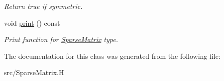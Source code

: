 \begin{DoxyCompactItemize}
\begin{DoxyCompactList}\small\item\em Return true if symmetric. \item\end{DoxyCompactList}\item 
\hypertarget{classSparseMatrix_a2ad9f6c7dc65dd71fcbb2f0461a4c5a9}{
void \hyperlink{classSparseMatrix_a2ad9f6c7dc65dd71fcbb2f0461a4c5a9}{print} () const }
\label{classSparseMatrix_a2ad9f6c7dc65dd71fcbb2f0461a4c5a9}

\begin{DoxyCompactList}\small\item\em Print function for \hyperlink{classSparseMatrix}{SparseMatrix} type. \item\end{DoxyCompactList}\end{DoxyCompactItemize}


The documentation for this class was generated from the following file:\begin{DoxyCompactItemize}
\item 
src/SparseMatrix.H\end{DoxyCompactItemize}
